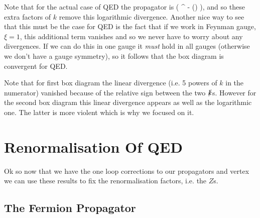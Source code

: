 \br 
    Note that for the actual case of QED the propagator is 
    \bse 
         \bigg( \eta^{\mu\nu} - () \bigg),
    \ese
    and so these extra factors of $k$ remove this logarithmic divergence. Another nice way to see that this must be the case for QED is the fact that if we work in Feynman gauge, $\xi=1$, this additional term vanishes and so we never have to worry about any divergences. If we can do this in one gauge it \textit{must} hold in all gauges (otherwise we don't have a gauge symmetry), so it follows that the box diagram is convergent for QED.
\er 

\br 
    Note that for first box diagram the linear divergence (i.e. 5 powers of $k$ in the numerator) vanished because of the relative sign between the two $\slashed{k}$s. However for the second box diagram this linear divergence appears as well as the logarithmic one. The latter is more violent which is why we focused on it.
\er 

\section{Renormalisation Of QED}

Ok so now that we have the one loop corrections to our propagators and vertex we can use these results to fix the renormalisation factors, i.e. the $Z$s. 

\subsection{The Fermion Propagator}


